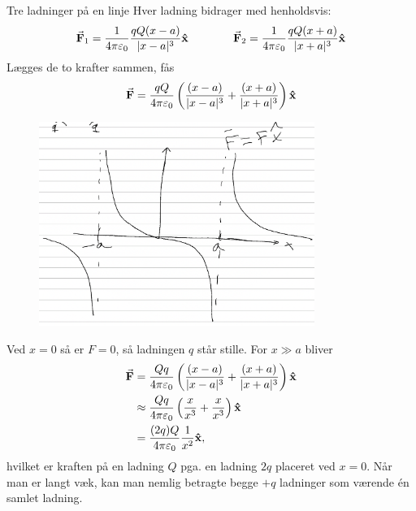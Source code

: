 \documentclass[crop=false, class=memoir]{standalone}
\begin{document}
\begin{opgave}{Tre ladninger på en linje}
    \opg Hver ladning bidrager med henholdsvis:
    \begin{align}
        \va{F}_1=\frac{1}{4\pi\varepsilon_0}\frac{qQ(x-a)}{|x-a|^3}\vu{x}\qquad \qquad \va{F}_2=\frac{1}{4\pi\varepsilon_0}\frac{qQ(x+a)}{|x+a|^3}\vu{x}
    \end{align}
    Lægges de to krafter sammen, fås
    \begin{align}
        \va{F}=\frac{qQ}{4\pi\varepsilon_0}\left(\frac{(x-a)}{|x-a|^3}+\frac{(x+a)}{|x+a|^3}\right)\vu{x}
    \end{align}
    \opg
    \begin{figure}[H]
        \centering
        \includegraphics[width=0.8\textwidth]{Elektro/Elekfig/elektro_opg4,2.png}
    \end{figure}
    \opg Ved $x=0$ så er $F=0$, så ladningen $q$ står stille.
    \opg For $x\gg a$ bliver
    \begin{align*}
        \va{F}&=\frac{Qq}{4\pi\varepsilon_0}\left(\frac{(x-a)}{|x-a|^3}+\frac{(x+a)}{|x+a|^3}\right)\vu{x}\\
        &\approx \frac{Qq}{4\pi\varepsilon_0}\left(\frac{x}{x^3}+\frac{x}{x^3}\right)\vu{x}\\
        &=\frac{(2q)Q}{4\pi\varepsilon_0}\frac{1}{x^2}\vu{x},
    \end{align*}
    hvilket er kraften på en ladning $Q$ pga. en ladning $2q$ placeret ved $x=0$. Når man er langt væk, kan man nemlig betragte begge $+q$ ladninger som værende én samlet ladning.
\end{opgave}
\end{document}
